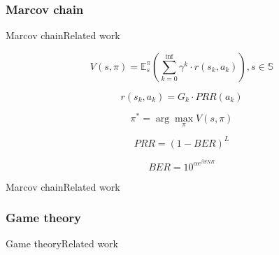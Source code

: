 \subsubsection{Marcov chain}

\begin{frame}{Marcov chain}{Related work}

\begin{equation}
V(s, \pi)=\mathbb{E}_{s}^{\pi}\left(\sum_{k=0}^{\mathrm{inf}} \gamma^{k} \cdot r\left(s_{k}, a_{k}\right)\right), s \in \mathbb{S}
\end{equation}

\begin{equation}
r\left(s_{k}, a_{k}\right)=G_{k} \cdot P R R\left(a_{k}\right)
\end{equation}

\begin{equation}
\pi^{*}=\arg \max _{\pi} V(s, \pi)
\end{equation}



\begin{equation}
PRR=(1-BER)^{L}
\end{equation}

\begin{equation}
BER=10^{\alpha e^{\beta SNR}}
\end{equation}

\end{frame}

\begin{frame}{Marcov chain}{Related work}
\end{frame}


\subsubsection{Game theory}
\begin{frame}{Game theory}{Related work}
 \end{frame}


